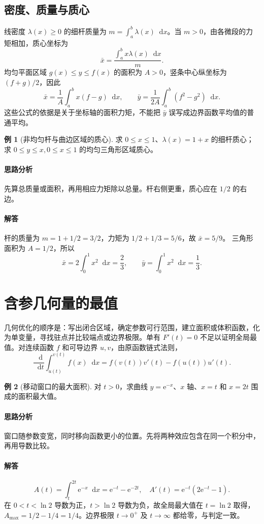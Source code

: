 \documentclass[UTF8,fontset=fandol,12pt,oneside,openany]{ctexrep}
\newcommand{\dd}{\mathop{}\!\mathrm d}
\newcommand{\ee}{\mathrm e}
\theoremstyle{definition}
\newtheorem{example}{例}[chapter]
\begin{document}
\subsection{密度、质量与质心}
线密度 $\lambda(x)\ge0$ 的细杆质量为 $m=\int_a^b\lambda(x)\dd x$。当 $m>0$，由各微段的力矩相加，质心坐标为
\[
 \bar x=\frac{\int_a^bx\lambda(x)\dd x}{m}.
\]
均匀平面区域 $g(x)\le y\le f(x)$ 的面积为 $A>0$，竖条中心纵坐标为 $(f+g)/2$，因此
\[
 \bar x=\frac1A\int_a^bx(f-g)\dd x,
 \qquad
 \bar y=\frac1{2A}\int_a^b(f^2-g^2)\dd x.
\]
这些公式的依据是关于坐标轴的面积力矩，不能把 $\bar y$ 误写成边界函数平均值的普通平均。

\begin{example}[非均匀杆与曲边区域的质心]
求 $0\le x\le1$、$\lambda(x)=1+x$ 的细杆质心；求 $0\le y\le x,0\le x\le1$ 的均匀三角形区域质心。
\end{example}
\paragraph{思路分析}先算总质量或面积，再用相应力矩除以总量。杆右侧更重，质心应在 $1/2$ 的右边。
\paragraph{解答}杆的质量为 $m=1+1/2=3/2$，力矩为 $1/2+1/3=5/6$，故 $\bar x=5/9$。
三角形面积为 $A=1/2$，所以
\[
 \bar x=2\int_0^1x^2\dd x=\frac23,
 \qquad \bar y=\int_0^1x^2\dd x=\frac13.
\]

\section{含参几何量的最值}
\label{lec:12:optimization}
几何优化的顺序是：写出闭合区域，确定参数可行范围，建立面积或体积函数，化为单变量，寻找驻点并比较端点或边界极限。单有 $F'(t)=0$ 不足以证明全局最值。对连续函数 $f$ 和可导边界 $u,v$，由原函数链式法则，
\[
 \frac{\dd}{\dd t}\int_{u(t)}^{v(t)}f(x)\dd x
 =f(v(t))v'(t)-f(u(t))u'(t).
\]

\begin{example}[移动窗口的最大面积]
对 $t>0$，求曲线 $y=\ee^{-x}$、$x$ 轴、$x=t$ 和 $x=2t$ 围成的面积最大值。
\end{example}
\paragraph{思路分析}窗口随参数变宽，同时移向函数更小的位置。先将两种效应包含在同一个积分中，再用导数比较。
\paragraph{解答}
\[
 A(t)=\int_t^{2t}\ee^{-x}\dd x=\ee^{-t}-\ee^{-2t},
 \quad A'(t)=\ee^{-t}(2\ee^{-t}-1).
\]
在 $0<t<\ln2$ 导数为正，$t>\ln2$ 导数为负，故全局最大值在 $t=\ln2$ 取得，$A_{\max}=1/2-1/4=1/4$。边界极限 $t\to0^+$ 及 $t\to\infty$ 都给零，与判定一致。
\end{document}
